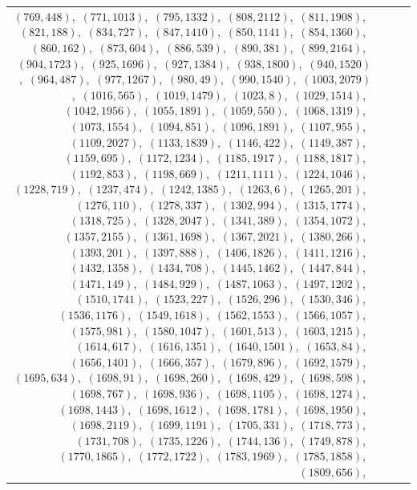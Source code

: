 \documentclass[11pt]{article}
\begin{document}
\begin{longtable}{@{}rrl>{\raggedright\arraybackslash}p{}@{}}
$(769,448)$,\allowbreak\ $(771,1013)$,\allowbreak\ $(795,1332)$,\allowbreak\ $(808,2112)$,\allowbreak\ $(811,1908)$,\allowbreak\ $(821,188)$,\allowbreak\ $(834,727)$,\allowbreak\ $(847,1410)$,\allowbreak\ $(850,1141)$,\allowbreak\ $(854,1360)$,\allowbreak\ $(860,162)$,\allowbreak\ $(873,604)$,\allowbreak\ $(886,539)$,\allowbreak\ $(890,381)$,\allowbreak\ $(899,2164)$,\allowbreak\ $(904,1723)$,\allowbreak\ $(925,1696)$,\allowbreak\ $(927,1384)$,\allowbreak\ $(938,1800)$,\allowbreak\ $(940,1520)$,\allowbreak\ $(964,487)$,\allowbreak\ $(977,1267)$,\allowbreak\ $(980,49)$,\allowbreak\ $(990,1540)$,\allowbreak\ $(1003,2079)$,\allowbreak\ $(1016,565)$,\allowbreak\ $(1019,1479)$,\allowbreak\ $(1023,8)$,\allowbreak\ $(1029,1514)$,\allowbreak\ $(1042,1956)$,\allowbreak\ $(1055,1891)$,\allowbreak\ $(1059,550)$,\allowbreak\ $(1068,1319)$,\allowbreak\ $(1073,1554)$,\allowbreak\ $(1094,851)$,\allowbreak\ $(1096,1891)$,\allowbreak\ $(1107,955)$,\allowbreak\ $(1109,2027)$,\allowbreak\ $(1133,1839)$,\allowbreak\ $(1146,422)$,\allowbreak\ $(1149,387)$,\allowbreak\ $(1159,695)$,\allowbreak\ $(1172,1234)$,\allowbreak\ $(1185,1917)$,\allowbreak\ $(1188,1817)$,\allowbreak\ $(1192,853)$,\allowbreak\ $(1198,669)$,\allowbreak\ $(1211,1111)$,\allowbreak\ $(1224,1046)$,\allowbreak\ $(1228,719)$,\allowbreak\ $(1237,474)$,\allowbreak\ $(1242,1385)$,\allowbreak\ $(1263,6)$,\allowbreak\ $(1265,201)$,\allowbreak\ $(1276,110)$,\allowbreak\ $(1278,337)$,\allowbreak\ $(1302,994)$,\allowbreak\ $(1315,1774)$,\allowbreak\ $(1318,725)$,\allowbreak\ $(1328,2047)$,\allowbreak\ $(1341,389)$,\allowbreak\ $(1354,1072)$,\allowbreak\ $(1357,2155)$,\allowbreak\ $(1361,1698)$,\allowbreak\ $(1367,2021)$,\allowbreak\ $(1380,266)$,\allowbreak\ $(1393,201)$,\allowbreak\ $(1397,888)$,\allowbreak\ $(1406,1826)$,\allowbreak\ $(1411,1216)$,\allowbreak\ $(1432,1358)$,\allowbreak\ $(1434,708)$,\allowbreak\ $(1445,1462)$,\allowbreak\ $(1447,844)$,\allowbreak\ $(1471,149)$,\allowbreak\ $(1484,929)$,\allowbreak\ $(1487,1063)$,\allowbreak\ $(1497,1202)$,\allowbreak\ $(1510,1741)$,\allowbreak\ $(1523,227)$,\allowbreak\ $(1526,296)$,\allowbreak\ $(1530,346)$,\allowbreak\ $(1536,1176)$,\allowbreak\ $(1549,1618)$,\allowbreak\ $(1562,1553)$,\allowbreak\ $(1566,1057)$,\allowbreak\ $(1575,981)$,\allowbreak\ $(1580,1047)$,\allowbreak\ $(1601,513)$,\allowbreak\ $(1603,1215)$,\allowbreak\ $(1614,617)$,\allowbreak\ $(1616,1351)$,\allowbreak\ $(1640,1501)$,\allowbreak\ $(1653,84)$,\allowbreak\ $(1656,1401)$,\allowbreak\ $(1666,357)$,\allowbreak\ $(1679,896)$,\allowbreak\ $(1692,1579)$,\allowbreak\ $(1695,634)$,\allowbreak\ $(1698,91)$,\allowbreak\ $(1698,260)$,\allowbreak\ $(1698,429)$,\allowbreak\ $(1698,598)$,\allowbreak\ $(1698,767)$,\allowbreak\ $(1698,936)$,\allowbreak\ $(1698,1105)$,\allowbreak\ $(1698,1274)$,\allowbreak\ $(1698,1443)$,\allowbreak\ $(1698,1612)$,\allowbreak\ $(1698,1781)$,\allowbreak\ $(1698,1950)$,\allowbreak\ $(1698,2119)$,\allowbreak\ $(1699,1191)$,\allowbreak\ $(1705,331)$,\allowbreak\ $(1718,773)$,\allowbreak\ $(1731,708)$,\allowbreak\ $(1735,1226)$,\allowbreak\ $(1744,136)$,\allowbreak\ $(1749,878)$,\allowbreak\ $(1770,1865)$,\allowbreak\ $(1772,1722)$,\allowbreak\ $(1783,1969)$,\allowbreak\ $(1785,1858)$,\allowbreak\ $(1809,656)$,\allowbreak\ 
\end{longtable}
\end{document}
